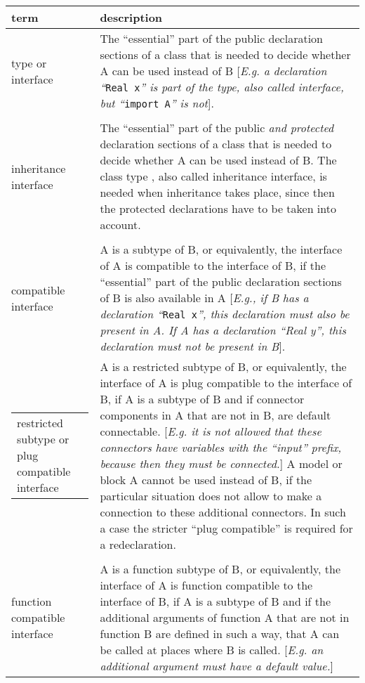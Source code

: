 \begin{longtable}{|p{4cm}|p{8cm}|}
\hline \endhead
\textbf{term} & \textbf{description}\\ \hline
type or interface
& The ``essential'' part of the public declaration sections of a class
that is needed to decide whether A can be used instead of B
{[}\emph{E.g. a declaration ``}\lstinline[basicstyle=\ttfamily]!Real x!\emph{'' is part of the type, also
called interface, but ``}\lstinline[basicstyle=\ttfamily]!import A!\emph{'' is not}{]}.
\\ \hline
\begin{tabular}{@{}p{4cm}@{}}
class type or\\
inheritance interface
\end{tabular}
&
The ``essential'' part of the public \emph{and protected} declaration
sections of a class that is needed to decide whether A can be used
instead of B. The class type , also called inheritance interface, is
needed when inheritance takes place, since then the protected
declarations have to be taken into account.\\ \hline
\begin{tabular}{@{}p{4cm}@{}}
subtype or\\
compatible interface
\end{tabular} &
A is a subtype of B, or equivalently, the interface of A is compatible
to the interface of B, if the ``essential'' part of the public
declaration sections of B is also available in A {[}\emph{E.g., if B has
a declaration ``}\lstinline[basicstyle=\ttfamily]!Real x!\emph{'', this declaration must also be present
in A. If A has a declaration ``Real y'', this declaration must not be
present in B}{]}.\\ \hline
\begin{tabular}{@{}p{4cm}@{}}
restricted subtype or
plug compatible interface
\end{tabular} &
A is a restricted subtype of B, or equivalently, the interface of A is
plug compatible to the interface of B, if A is a subtype of B and if
connector components in A that are not in B, are default connectable.
{[}\emph{E.g. it is not allowed that these connectors have variables
with the ``input'' prefix, because then they must be connected.}{]} A
model or block A cannot be used instead of B, if the particular
situation does not allow to make a connection to these additional
connectors. In such a case the stricter ``plug compatible'' is required
for a redeclaration.\\ \hline
\begin{tabular}{@{}p{4cm}@{}}
function subtype or\\
function compatible interface
\end{tabular} &
A is a function subtype of B, or equivalently, the interface of A is
function compatible to the interface of B, if A is a subtype of B and if
the additional arguments of function A that are not in function B are
defined in such a way, that A can be called at places where B is called.
{[}\emph{E.g. an additional argument must have a default
value.}{]}\\ \hline
\end{longtable}

